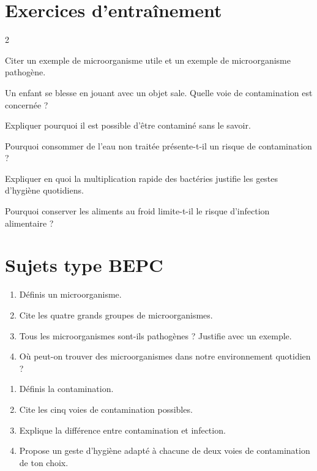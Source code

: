 \section{Exercices d'entraînement}
\begin{multicols}{2}

\exo{} Citer un exemple de microorganisme utile et un exemple de
microorganisme pathogène.

\exo{} Un enfant se blesse en jouant avec un objet sale. Quelle voie de
contamination est concernée ?

\exo{} Expliquer pourquoi il est possible d'être contaminé sans le savoir.

\exo{} Pourquoi consommer de l'eau non traitée présente-t-il un risque de
contamination ?

\exo{} Expliquer en quoi la multiplication rapide des bactéries justifie les
gestes d'hygiène quotidiens.

\exo{} Pourquoi conserver les aliments au froid limite-t-il le risque
d'infection alimentaire ?

\end{multicols}

\section{Sujets type BEPC}

\begin{enumerate}[label=\arabic*)]
\item Définis un microorganisme.
\item Cite les quatre grands groupes de microorganismes.
\item Tous les microorganismes sont-ils pathogènes ? Justifie avec un exemple.
\item Où peut-on trouver des microorganismes dans notre environnement quotidien ?
\end{enumerate}

\sujetbac[La contamination]
\begin{enumerate}[label=\arabic*)]
\item Définis la contamination.
\item Cite les cinq voies de contamination possibles.
\item Explique la différence entre contamination et infection.
\item Propose un geste d'hygiène adapté à chacune de deux voies de contamination de
ton choix.
\end{enumerate}

